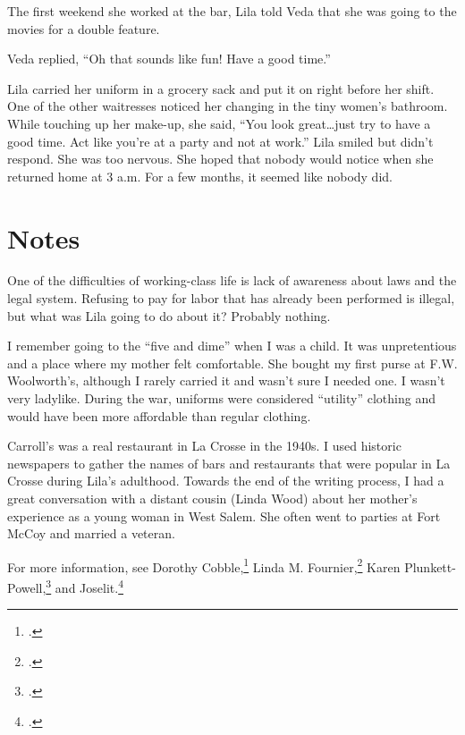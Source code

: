 \documentclass[
  american,
  letterpaper,
]{book}
\begin{document}
The first weekend she worked at the bar, Lila told Veda that she was
going to the movies for a double feature.

Veda replied, ``Oh that sounds like fun! Have a good time.''

Lila carried her uniform in a grocery sack and put it on right before
her shift. One of the other waitresses noticed her changing in the tiny
women's bathroom. While touching up her make-up, she said, ``You look
great\ldots just try to have a good time. Act like you're at a party and
not at work.'' Lila smiled but didn't respond. She was too nervous. She
hoped that nobody would notice when she returned home at 3 a.m. For a
few months, it seemed like nobody did.

\section{Notes}\label{notes-28}

One of the difficulties of working-class life is lack of awareness about
laws and the legal system. Refusing to pay for labor that has already
been performed is illegal, but what was Lila going to do about it?
Probably nothing.

I remember going to the ``five and dime'' when I was a child. It was
unpretentious and a place where my mother felt comfortable. She bought
my first purse at F.W. Woolworth's, although I rarely carried it and
wasn't sure I needed one. I wasn't very ladylike. During the war,
uniforms were considered ``utility'' clothing and would have been more
affordable than regular clothing.

Carroll's was a real restaurant in La Crosse in the 1940s. I used
historic newspapers to gather the names of bars and restaurants that
were popular in La Crosse during Lila's adulthood. Towards the end of
the writing process, I had a great conversation with a distant cousin
(Linda Wood) about her mother's experience as a young woman in West
Salem. She often went to parties at Fort McCoy and married a veteran.

For more information, see Dorothy Cobble,\footnote{.} Linda M.
Fournier,\footnote{.} Karen
Plunkett-Powell,\footnote{.} and
Joselit.\footnote{.}
\end{document}
